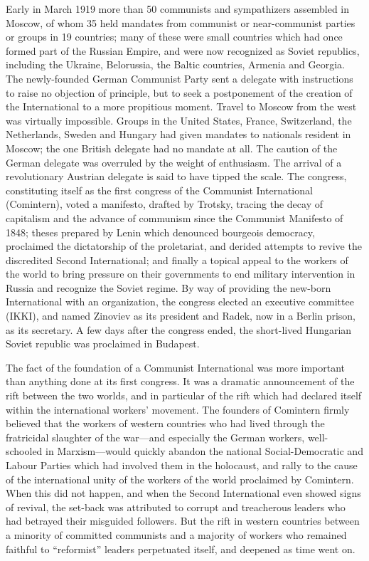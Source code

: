 Early in March 1919 more than 50 communists and sympathizers assembled in Moscow, of whom 35 held mandates from communist or near-communist parties or groups in 19 countries; many of these were small countries which had once formed part of the Russian Empire, and were now recognized as Soviet republics, including the Ukraine, Belorussia, the Baltic countries, Armenia and Georgia. The newly-founded German Communist Party sent a delegate with instructions to raise no objection of principle, but to seek a postponement of the creation of the International to a more propitious moment. Travel to Moscow from the west was virtually impossible. Groups in the United States, France, Switzerland, the Netherlands, Sweden and Hungary had given mandates to nationals resident in Moscow; the one British delegate had no mandate at all. The caution of the German delegate was overruled by the weight of enthusiasm. The arrival of a revolutionary Austrian delegate is said to have tipped the scale. The congress, constituting itself as the first congress of the Communist International (Comintern), voted a manifesto, drafted by Trotsky, tracing the decay of capitalism and the advance of communism since the Communist Manifesto of 1848; theses prepared by Lenin which denounced bourgeois democracy, proclaimed the dictatorship of the proletariat, and derided attempts to revive the discredited Second International; and finally a topical appeal to the workers of the world to bring pressure on their governments to end military intervention in Russia and recognize the Soviet regime. By way of providing the new-born International with an organization, the congress elected an executive committee (IKKI), and named Zinoviev as its president and Radek, now in a Berlin prison, as its secretary. A few days after the congress ended, the short-lived Hungarian Soviet republic was proclaimed in Budapest. 

The fact of the foundation of a Communist International was more important than anything done at its first congress. It was a dramatic announcement of the rift between the two worlds, and in particular of the rift which had declared itself within the international workers' movement. The founders of Comintern firmly believed that the workers of western countries who had lived through the fratricidal slaughter of the war---and especially the German workers, well-schooled in Marxism---would quickly abandon the national Social-Democratic and Labour Parties which had involved them in the holocaust, and rally to the cause of the international unity of the workers of the world proclaimed by Comintern. When this did not happen, and when the Second International even showed signs of revival, the set-back was attributed to corrupt and treacherous leaders who had betrayed their misguided followers. But the rift in western countries between a minority of committed communists and a majority of workers who remained faithful to ``reformist'' leaders perpetuated itself, and deepened as time went on. 

